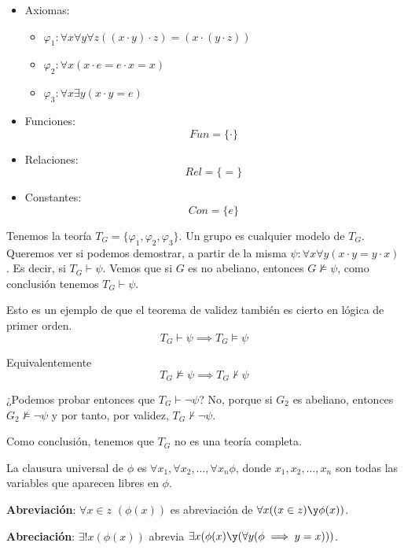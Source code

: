 \begin{example}\mbox{}

\begin{itemize}

	\item Axiomas:
	\begin{itemize}
		\vspace{-3mm}
		\item $\varphi_1: \forall x\forall y\forall z ((x\cdot y)\cdot z) = (x\cdot(y\cdot z))$
		\item $\varphi_2: \forall x(x\cdot e = e\cdot x = x)$
		\item $\varphi_3: \forall x\exists y (x\cdot y = e)$
	\end{itemize}

	\item Funciones:
	$$Fun = \{\cdot\}$$
	
	\item Relaciones:
	$$Rel = \{=\}$$
	
	\item Constantes:
	$$Con = \{e\}$$
\end{itemize}

Tenemos la teoría $T_G = \{\varphi_1, \varphi_2, \varphi_3\}$. Un grupo es cualquier modelo de $T_G$. Queremos ver si podemos demostrar, a partir de la misma $\psi: \forall x\forall y(x\cdot y = y\cdot x)$. Es decir, si $T_G\vdash \psi$. Vemos que si $G$ es no abeliano, entonces $G\nvDash \psi$, como conclusión tenemos $T_G\vdash \psi$.

Esto es un ejemplo de que el teorema de validez también es cierto en lógica de primer orden.
$$T_G\vdash \psi \implies T_G \vDash \psi$$

Equivalentemente
$$T_G\nvDash \psi \implies T_G \nvdash \psi$$

¿Podemos probar entonces que $T_G\vdash \neg \psi$? No, porque si $G_2$ es abeliano, entonces $G_2\nvDash \neg\psi$ y por tanto, por validez, $T_G\nvdash \neg \psi$.

Como conclusión, tenemos que $T_G$ no es una teoría completa.
\end{example}

\begin{defn}
	La clausura universal de $\phi$ es $\forall x_1, \forall x_2,\hdots, \forall x_n \phi$, donde $x_1, x_2, \hdots, x_n$ son todas las variables que aparecen libres en $\phi$.
	
	\textbf{Abreviación}: $\forall x\in z$ $(\phi(x))$ es abreviación de $\forall x ((x\in z) \y \phi (x))$.
	
	\textbf{Abreciación}: $\exists ! x(\phi (x))$ abrevia $\exists x(\phi (x) \y (\forall y (\phi \implies y = x)))$.
\end{defn}

